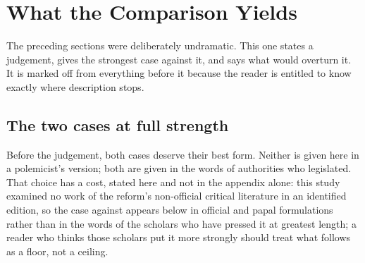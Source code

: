 \section{What the Comparison Yields}

The preceding sections were deliberately undramatic. This one states a judgement, gives the strongest case against it, and says what would overturn it. It is marked off from everything before it because the reader is entitled to know exactly where description stops.

\subsection{The two cases at full strength}

Before the judgement, both cases deserve their best form. Neither is given here in a polemicist's version; both are given in the words of authorities who legislated. That choice has a cost, stated here and not in the appendix alone: this study examined no work of the reform's non-official critical literature in an identified edition, so the case against appears below in official and papal formulations rather than in the words of the scholars who have pressed it at greatest length; a reader who thinks those scholars put it more strongly should treat what follows as a floor, not a ceiling.

